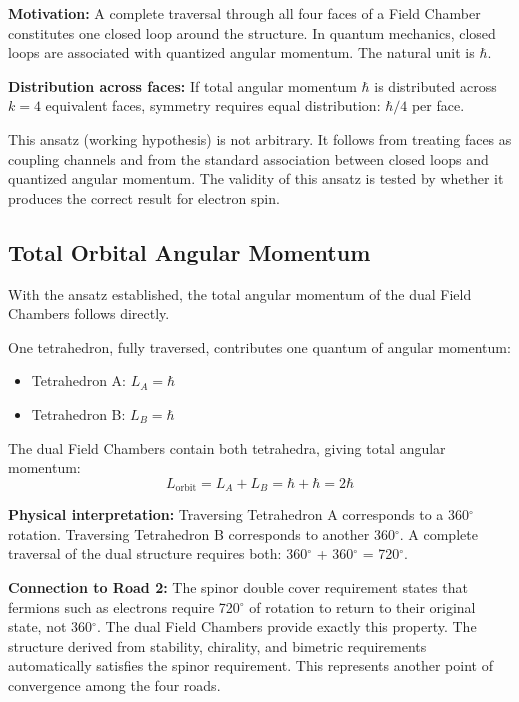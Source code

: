 \documentclass[aps,prd,preprint,superscriptaddress,showpacs,preprintnumbers,amsmath,amssymb,nofootinbib]{revtex4-2}
\begin{document}
\textbf{Motivation:} A complete traversal through all four faces of a Field Chamber constitutes one closed loop around the structure. In quantum mechanics, closed loops are associated with quantized angular momentum. The natural unit is $\hbar$.

\textbf{Distribution across faces:} If total angular momentum $\hbar$ is distributed across $k=4$ equivalent faces, symmetry requires equal distribution: $\hbar/4$ per face.

This ansatz (working hypothesis) is not arbitrary. It follows from treating faces as coupling channels and from the standard association between closed loops and quantized angular momentum. The validity of this ansatz is tested by whether it produces the correct result for electron spin.

\subsection{Total Orbital Angular Momentum}
\label{subsec:orbital}

With the ansatz established, the total angular momentum of the dual Field Chambers follows directly.

One tetrahedron, fully traversed, contributes one quantum of angular momentum:
\begin{itemize}
\item Tetrahedron A: $L_A = \hbar$
\item Tetrahedron B: $L_B = \hbar$
\end{itemize}

The dual Field Chambers contain both tetrahedra, giving total angular momentum:
\begin{equation}
L_{\text{orbit}} = L_A + L_B = \hbar + \hbar = 2\hbar
\end{equation}

\textbf{Physical interpretation:} Traversing Tetrahedron A corresponds to a 360$^\circ$ rotation. Traversing Tetrahedron B corresponds to another 360$^\circ$. A complete traversal of the dual structure requires both: 360$^\circ$ + 360$^\circ$ = 720$^\circ$.

\textbf{Connection to Road 2:} The spinor double cover requirement states that fermions such as electrons require 720$^\circ$ of rotation to return to their original state, not 360$^\circ$. The dual Field Chambers provide exactly this property. The structure derived from stability, chirality, and bimetric requirements automatically satisfies the spinor requirement. This represents another point of convergence among the four roads.
\end{document}
